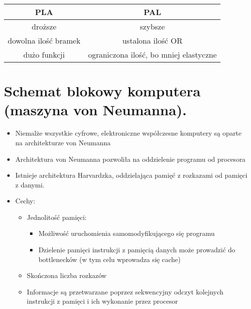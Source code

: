 \documentclass[main.tex]{subfiles}
\begin{document}
    \begin{center}
        \begin{tabular}{| c | c |}
            \hline
            \textbf{PLA} & \textbf{PAL}\\
            \hline
            droższe & szybsze\\
            dowolna ilość bramek & ustalona ilość OR\\
            dużo funkcji & ograniczona ilość, bo mniej elastyczne\\
            \hline
        \end{tabular}
    \end{center}


    \section{Schemat blokowy komputera (maszyna von Neumanna).}

    \begin{itemize}[noitemsep]
        \item Niemalże wszystkie cyfrowe, elektroniczne współczesne komputery są oparte na architekturze von Neumanna
        \item Architektura von Neumanna pozwoliła na oddzielenie programu od procesora
        \item Istnieje architektura Harvardzka, oddzielająca pamięć z rozkazami od pamięci z danymi.
        \item Cechy:
        \begin{itemize}[noitemsep]
            \item Jednolitość pamięci:
            \begin{itemize}
                \item Możliwość uruchomienia samomodyfikującego się programu
                \item Dzielenie pamięci instrukcji z pamięcią danych może prowadzić do bottlenecków (w tym celu wprowadza się cache)
            \end{itemize}
            \item Skończona liczba rozkazów
            \item Informacje są przetwarzane poprzez sekwencyjny odczyt kolejnych instrukcji z pamięci i ich wykonanie przez procesor
        \end{itemize}
    \end{itemize}
\end{document}
